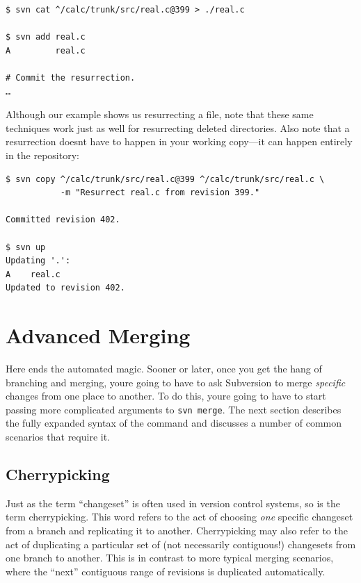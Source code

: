 \begin{verbatim}
$ svn cat ^/calc/trunk/src/real.c@399 > ./real.c

$ svn add real.c
A         real.c

# Commit the resurrection.
…
\end{verbatim}

Although our example shows us resurrecting a file, note that these same
techniques work just as well for resurrecting deleted directories. Also
note that a resurrection doesn\textquotesingle t have to happen in your
working copy---it can happen entirely in the repository:

\begin{verbatim}
$ svn copy ^/calc/trunk/src/real.c@399 ^/calc/trunk/src/real.c \
           -m "Resurrect real.c from revision 399."

Committed revision 402.

$ svn up
Updating '.':
A    real.c
Updated to revision 402.
\end{verbatim}

\section{Advanced Merging}\label{svn.branchmerge.advanced}

Here ends the automated magic. Sooner or later, once you get the hang of
branching and merging, you\textquotesingle re going to have to ask
Subversion to merge \emph{specific} changes from one place to another.
To do this, you\textquotesingle re going to have to start passing more
complicated arguments to \texttt{svn\ merge}. The next section describes
the fully expanded syntax of the command and discusses a number of
common scenarios that require it.

\subsection{Cherrypicking}\label{svn.branchmerge.cherrypicking}

Just as the term ``changeset'' is often used in version control systems,
so is the term cherrypicking. This word refers to the act of choosing
\emph{one} specific changeset from a branch and replicating it to
another. Cherrypicking may also refer to the act of duplicating a
particular set of (not necessarily contiguous!) changesets from one
branch to another. This is in contrast to more typical merging
scenarios, where the ``next'' contiguous range of revisions is
duplicated automatically.


